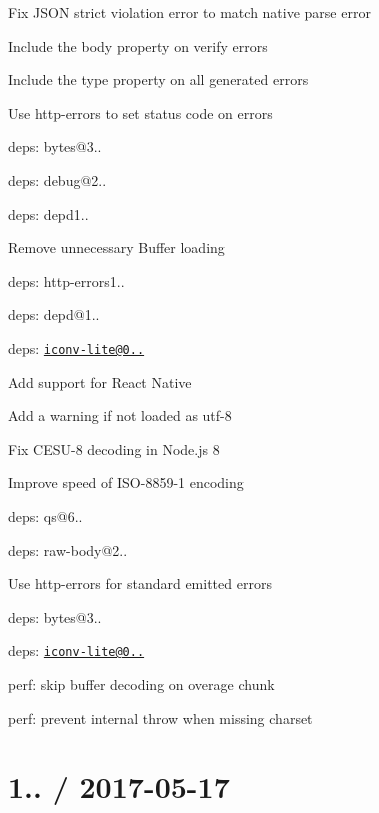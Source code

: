 \begin{DoxyItemize}
\item Fix J\+S\+ON strict violation error to match native parse error
\item Include the {\ttfamily body} property on verify errors
\item Include the {\ttfamily type} property on all generated errors
\item Use {\ttfamily http-\/errors} to set status code on errors
\item deps\+: bytes@3..
\item deps\+: debug@2..
\item deps\+: depd1..
\begin{DoxyItemize}
\item Remove unnecessary {\ttfamily Buffer} loading
\end{DoxyItemize}
\item deps\+: http-\/errors1..
\begin{DoxyItemize}
\item deps\+: depd@1..
\end{DoxyItemize}
\item deps\+: \href{mailto:iconv-lite@0.4.18}{\tt iconv-\/lite@0..}
\begin{DoxyItemize}
\item Add support for React Native
\item Add a warning if not loaded as utf-\/8
\item Fix C\+E\+S\+U-\/8 decoding in Node.\+js 8
\item Improve speed of I\+S\+O-\/8859-\/1 encoding
\end{DoxyItemize}
\item deps\+: qs@6..
\item deps\+: raw-\/body@2..
\begin{DoxyItemize}
\item Use {\ttfamily http-\/errors} for standard emitted errors
\item deps\+: bytes@3..
\item deps\+: \href{mailto:iconv-lite@0.4.18}{\tt iconv-\/lite@0..}
\item perf\+: skip buffer decoding on overage chunk
\end{DoxyItemize}
\item perf\+: prevent internal {\ttfamily throw} when missing charset
\end{DoxyItemize}

\section*{1.. / 2017-\/05-\/17 }


